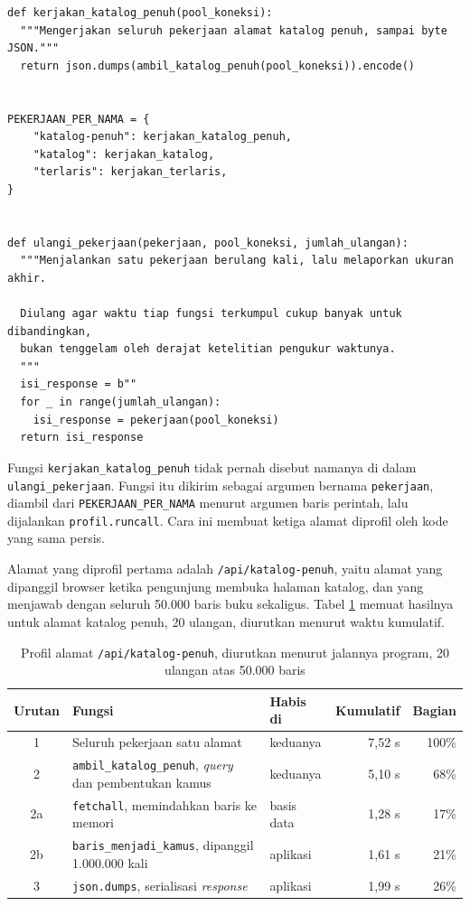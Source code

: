 \begin{lstlisting}[style=PythonStyle, caption={Memprofil pekerjaan satu alamat di dalam proses, tersedia di \berkas{sources/chapter05/profil-endpoint.py}}, label={lst:profil}]
def kerjakan_katalog_penuh(pool_koneksi):
  """Mengerjakan seluruh pekerjaan alamat katalog penuh, sampai byte JSON."""
  return json.dumps(ambil_katalog_penuh(pool_koneksi)).encode()


PEKERJAAN_PER_NAMA = {
    "katalog-penuh": kerjakan_katalog_penuh,
    "katalog": kerjakan_katalog,
    "terlaris": kerjakan_terlaris,
}


def ulangi_pekerjaan(pekerjaan, pool_koneksi, jumlah_ulangan):
  """Menjalankan satu pekerjaan berulang kali, lalu melaporkan ukuran akhir.

  Diulang agar waktu tiap fungsi terkumpul cukup banyak untuk dibandingkan,
  bukan tenggelam oleh derajat ketelitian pengukur waktunya.
  """
  isi_response = b""
  for _ in range(jumlah_ulangan):
    isi_response = pekerjaan(pool_koneksi)
  return isi_response
\end{lstlisting}

Fungsi \texttt{kerjakan\_katalog\_penuh} tidak pernah disebut namanya di dalam
\texttt{ulangi\_pekerjaan}. Fungsi itu dikirim sebagai argumen bernama
\texttt{pekerjaan}, diambil dari \texttt{PEKERJAAN\_PER\_NAMA} menurut argumen
baris perintah, lalu dijalankan \texttt{profil.runcall}. Cara ini membuat
ketiga alamat diprofil oleh kode yang sama persis.

Alamat yang diprofil pertama adalah \texttt{/api/katalog-penuh}, yaitu alamat
yang dipanggil browser ketika pengunjung membuka halaman katalog, dan yang
menjawab dengan seluruh 50.000 baris buku sekaligus.
Tabel \ref{tab:profil} memuat hasilnya untuk alamat katalog penuh, 20 ulangan,
diurutkan menurut waktu kumulatif.

\begin{table}[!htb]
  \centering
  \caption{Profil alamat \texttt{/api/katalog-penuh}, diurutkan menurut
           jalannya program, 20 ulangan atas 50.000 baris}
  \label{tab:profil}
  \begin{tabularx}{\textwidth}{cXlrr}
    \hline
    \textbf{Urutan} & \textbf{Fungsi} & \textbf{Habis di} & \textbf{Kumulatif} & \textbf{Bagian} \\
    \hline
    1 & Seluruh pekerjaan satu alamat & keduanya & 7,52 s & 100\% \\
    \hline
    2 & \texttt{ambil\_katalog\_penuh}, \textit{query} dan pembentukan kamus & keduanya & 5,10 s & 68\% \\
    \hline
    2a & \quad \texttt{fetchall}, memindahkan baris ke memori & basis data & 1,28 s & 17\% \\
    \hline
    2b & \quad \texttt{baris\_menjadi\_kamus}, dipanggil 1.000.000 kali & aplikasi & 1,61 s & 21\% \\
    \hline
    3 & \texttt{json.dumps}, serialisasi \textit{response} & aplikasi & 1,99 s & 26\% \\
    \hline
  \end{tabularx}
\end{table}

